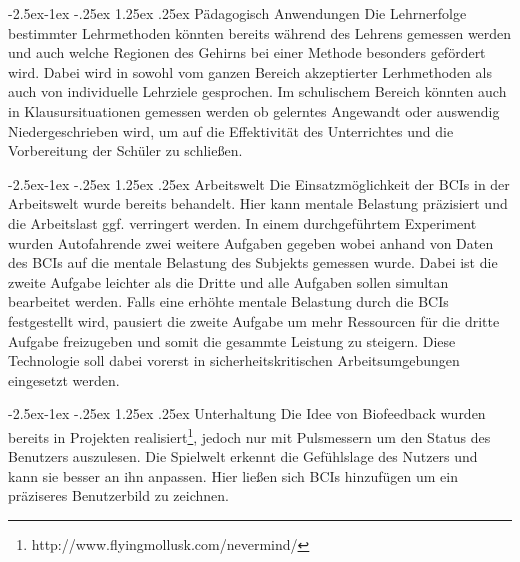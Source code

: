 \documentclass[11pt,ngerman,parskip=half]{scrartcl}
\makeatletter
\renewcommand\paragraph{\@startsection{paragraph}{4}{\z@}%
            {-2.5ex\@plus -1ex \@minus -.25ex}%
            {1.25ex \@plus .25ex}%
            {\normalfont\normalsize\bfseries}}
\makeatother
\begin{document}
\paragraph{Pädagogisch Anwendungen}
Die Lehrnerfolge bestimmter Lehrmethoden könnten bereits während des Lehrens
gemessen werden und auch welche Regionen des Gehirns bei einer Methode
besonders gefördert wird. Dabei wird in \parencite{beyond} sowohl vom ganzen
Bereich akzeptierter Lerhmethoden als auch von individuelle Lehrziele
gesprochen. Im schulischem Bereich könnten auch in Klausursituationen
gemessen werden ob gelerntes Angewandt oder auswendig Niedergeschrieben wird,
um auf die Effektivität des Unterrichtes und die Vorbereitung der Schüler zu
schließen.

\paragraph{Arbeitswelt}
Die Einsatzmöglichkeit der BCIs in der Arbeitswelt wurde bereits
behandelt\parencite{beyond,workload}. Hier kann mentale Belastung präzisiert
und die Arbeitslast ggf. verringert werden. In einem durchgeführtem
Experiment\parencite[24.3]{workload} wurden Autofahrende zwei weitere
Aufgaben gegeben wobei anhand von Daten des BCIs auf die mentale Belastung des
Subjekts gemessen wurde. Dabei ist die zweite Aufgabe leichter als die Dritte
und alle Aufgaben sollen simultan bearbeitet werden. Falls eine erhöhte
mentale Belastung durch die BCIs festgestellt wird, pausiert die zweite
Aufgabe um mehr Ressourcen für die dritte Aufgabe freizugeben und somit die
gesammte Leistung zu steigern. Diese Technologie soll dabei vorerst in sicherheitskritischen Arbeitsumgebungen eingesetzt werden.

\paragraph{Unterhaltung}
 Die Idee von Biofeedback wurden bereits in Projekten
 realisiert\footnote{http://www.flyingmollusk.com/nevermind/}, jedoch nur mit
 Pulsmessern um den Status des Benutzers auszulesen. Die Spielwelt erkennt die Gefühlslage des Nutzers und kann sie besser an ihn anpassen.
Hier ließen sich BCIs hinzufügen um ein präziseres Benutzerbild zu zeichnen.
\end{document}
